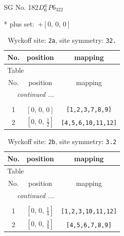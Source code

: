 \documentclass[fleqn,8pt]{jsarticle}
\begin{document}
\setcounter{MaxMatrixCols}{32}

\renewcommand{\tablename}{Table~}
\renewcommand{\figurename}{Figure~}
\begin{center}
\LARGE
SG No. 182\quad$D_{\rm 6}^{6}$\quad$P6_322$\quad[ hexagonal ]
\end{center}
* plus set:\,\,\,$+\left[ 0,\, 0,\, 0 \right]$
\renewcommand{\arraystretch}{1.2}
\begin{longtable}{ccc}
\caption{Wyckoff site: {\tt 2a}, site symmetry: {\tt 32.}}
 \\
 \hline \hline
No. & position & mapping \\ \hline \endfirsthead

\multicolumn{2}{l}{\tablename\ \thetable{}} \\
 \hline \hline
No. & position & mapping \\ \hline \endhead

 \hline \hline
\multicolumn{2}{r}{\footnotesize\it continued ...} \\ \endfoot

 \hline \hline
\multicolumn{2}{r}{} \\ \endlastfoot

1 & $\left[ 0,\, 0,\, 0 \right]$ & {\tt [1,2,3,7,8,9]} \\ \hline
2 & $\left[ 0,\, 0,\, \frac{1}{2} \right]$ & {\tt [4,5,6,10,11,12]} \\
\end{longtable}
\renewcommand{\arraystretch}{1.2}
\begin{longtable}{ccc}
\caption{Wyckoff site: {\tt 2b}, site symmetry: {\tt 3.2}}
 \\
 \hline \hline
No. & position & mapping \\ \hline \endfirsthead

\multicolumn{2}{l}{\tablename\ \thetable{}} \\
 \hline \hline
No. & position & mapping \\ \hline \endhead

 \hline \hline
\multicolumn{2}{r}{\footnotesize\it continued ...} \\ \endfoot

 \hline \hline
\multicolumn{2}{r}{} \\ \endlastfoot

1 & $\left[ 0,\, 0,\, \frac{1}{4} \right]$ & {\tt [1,2,3,10,11,12]} \\ \hline
2 & $\left[ 0,\, 0,\, \frac{3}{4} \right]$ & {\tt [4,5,6,7,8,9]} \\
\end{longtable}
\end{document}
